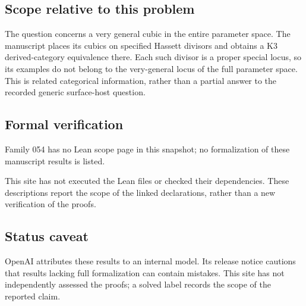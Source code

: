 \documentclass[11pt]{article}
\begin{document}
\subsection{Scope relative to this problem}
The question concerns a very general cubic in the entire parameter space. The manuscript places its cubics on specified Hassett divisors and obtains a K3 derived-category equivalence there. Each such divisor is a proper special locus, so its examples do not belong to the very-general locus of the full parameter space. This is related categorical information, rather than a partial answer to the recorded generic surface-host question.

\subsection{Formal verification}
Family 054 has no Lean scope page in this snapshot; no formalization of these manuscript results is listed.

This site has not executed the Lean files or checked their dependencies. These descriptions report the scope of the linked declarations, rather than a new verification of the proofs.

\subsection{Status caveat}
OpenAI attributes these results to an internal model. Its release notice cautions that results lacking full formalization can contain mistakes. This site has not independently assessed the proofs; a solved label records the scope of the reported claim.
\end{document}
